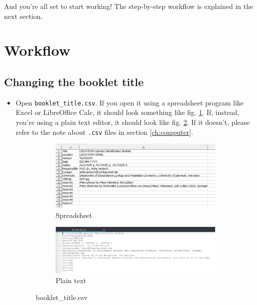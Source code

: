 \documentclass[a4paper,12pt,twoside]{article}
\begin{document}
    And you're all set to start working! The step-by-step workflow is explained in the next section.

    \newpage

    \section{Workflow}
        \subsection{Changing the booklet title} \label{ch:title}
            \begin{itemize}
                \item Open \texttt{booklet\_title.csv}. If you open it using a spreadsheet program like Excel or LibreOffice Calc, it should look something like fig. \ref{fig:booklet_title_csv}. If, instead, you're using a plain text editor, it should look like fig. \ref{fig:booklet_title_csv_plain}. If it doesn't, please refer to the note about \texttt{.csv} files in section \ref{ch:computer}.

                    \begin{figure}[h]
                      \centering
                      \begin{subfigure}[b]{0.9\textwidth}
                        \includegraphics[width=\textwidth]{booklet_title_csv.png}
                        \caption{Spreadsheet}
                        \label{fig:booklet_title_csv}
                      \end{subfigure}
                      \hfill
                      \begin{subfigure}[b]{0.9\textwidth}
                        \includegraphics[width=\textwidth]{booklet_title_csv_plain.png}
                        \caption{Plain text}
                        \label{fig:booklet_title_csv_plain}
                      \end{subfigure}
                      \caption{booklet\_title.csv}
                      \label{fig:figure}
                    \end{figure}


\end{itemize}
\end{document}
